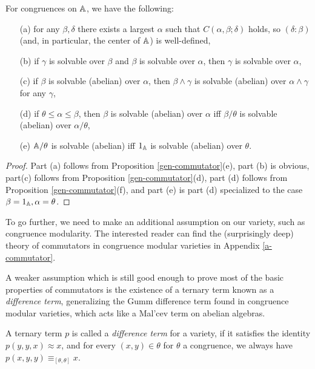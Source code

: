 \documentclass[letterpaper,11pt]{article}
\begin{document}
\begin{prop} For congruences on $\mathbb{A}$, we have the following:
\begin{itemize}
\item[(a)] for any $\beta,\delta$ there exists a largest $\alpha$ such that $C(\alpha,\beta;\delta)$ holds, so $(\delta:\beta)$ (and, in particular, the center of $\mathbb{A}$) is well-defined,

\item[(b)] if $\gamma$ is solvable over $\beta$ and $\beta$ is solvable over $\alpha$, then $\gamma$ is solvable over $\alpha$,

\item[(c)] if $\beta$ is solvable (abelian) over $\alpha$, then $\beta \wedge \gamma$ is solvable (abelian) over $\alpha \wedge \gamma$ for any $\gamma$,

\item[(d)] if $\theta \le \alpha \le \beta$, then $\beta$ is solvable (abelian) over $\alpha$ iff $\beta/\theta$ is solvable (abelian) over $\alpha/\theta$,

\item[(e)] $\mathbb{A}/\theta$ is solvable (abelian) iff $1_{\mathbb{A}}$ is solvable (abelian) over $\theta$.
\end{itemize}
\end{prop}
\begin{proof} Part (a) follows from Proposition \ref{gen-commutator}(e), part (b) is obvious, part(c) follows from Proposition \ref{gen-commutator}(d), part (d) follows from Proposition \ref{gen-commutator}(f), and part (e) is part (d) specialized to the case $\beta = 1_{\mathbb{A}}, \alpha = \theta$.
\end{proof}

To go further, we need to make an additional assumption on our variety, such as congruence modularity. The interested reader can find the (surprisingly deep) theory of commutators in congruence modular varieties in Appendix \ref{a-commutator}.

A weaker assumption which is still good enough to prove most of the basic properties of commutators is the existence of a ternary term known as a \emph{difference term}, generalizing the Gumm difference term found in congruence modular varieties, which acts like a Mal'cev term on abelian algebras.

\begin{defn} A ternary term $p$ is called a \emph{difference term} for a variety, if it satisfies the identity $p(y,y,x) \approx x$, and for every $(x,y) \in \theta$ for $\theta$ a congruence, we always have $p(x,y,y) \equiv_{[\theta,\theta]} x$.
\end{defn}
\end{document}
